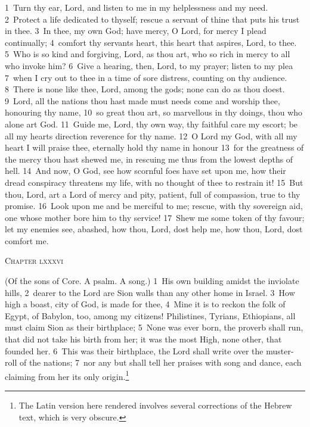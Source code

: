 \documentclass[10pt]{book} %
\begin{document}
\textcolor{benred8}{1}~Turn thy ear, Lord, and listen to me in my helplessness and my need. \textcolor{benred8}{2}~Protect a life dedicated to thyself; rescue a servant of thine that puts his trust in thee. \textcolor{benred8}{3}~In thee, my own God; have mercy, O Lord, for mercy I plead continually; \textcolor{benred8}{4}~comfort thy servant\textquotesingle s heart, this heart that aspires, Lord, to thee. \textcolor{benred8}{5}~Who is so kind and forgiving, Lord, as thou art, who so rich in mercy to all who invoke him? \textcolor{benred8}{6}~Give a hearing, then, Lord, to my prayer; listen to my plea \textcolor{benred8}{7}~when I cry out to thee in a time of sore distress, counting on thy audience. \textcolor{benred8}{8}~There is none like thee, Lord, among the gods; none can do as thou doest. \textcolor{benred8}{9}~Lord, all the nations thou hast made must needs come and worship thee, honouring thy name, \textcolor{benred8}{10}~so great thou art, so marvellous in thy doings, thou who alone art God.
\textcolor{benred8}{11}~Guide me, Lord, thy own way, thy faithful care my escort; be all my heart\textquotesingle s direction reverence for thy name. \textcolor{benred8}{12}~O Lord my God, with all my heart I will praise thee, eternally hold thy name in honour \textcolor{benred8}{13}~for the greatness of the mercy thou hast shewed me, in rescuing me thus from the lowest depths of hell. \textcolor{benred8}{14}~And now, O God, see how scornful foes have set upon me, how their dread conspiracy threatens my life, with no thought of thee to restrain it! \textcolor{benred8}{15}~But thou, Lord, art a Lord of mercy and pity, patient, full of compassion, true to thy promise. \textcolor{benred8}{16}~Look upon me and be merciful to me; rescue, with thy sovereign aid, one whose mother bore him to thy service! \textcolor{benred8}{17}~Shew me some token of thy favour; let my enemies see, abashed, how thou, Lord, dost help me, how thou, Lord, dost comfort me.
\begin{large}\begin{center}\textsc{Chapter lxxxvi}\end{center}\end{large}
(Of the sons of Core. A psalm. A song.)
\textcolor{benred8}{1}~His own building amidst the inviolate hills, \textcolor{benred8}{2}~dearer to the Lord are Sion walls than any other home in Israel. \textcolor{benred8}{3}~How high a boast, city of God, is made for thee, \textcolor{benred8}{4}~Mine it is to reckon the folk of Egypt, of Babylon, too, among my citizens! Philistines, Tyrians, Ethiopians, all must claim Sion as their birthplace; \textcolor{benred8}{5}~None was ever born, the proverb shall run, that did not take his birth from her; it was the most High, none other, that founded her. \textcolor{benred8}{6}~This was their birthplace, the Lord shall write over the muster-roll of the nations; \textcolor{benred8}{7}~nor any but shall tell her praises with song and dance, each claiming from her its only origin.\footnote[1]{The Latin version here rendered involves several corrections of the Hebrew text, which is very obscure.}
\end{document}
